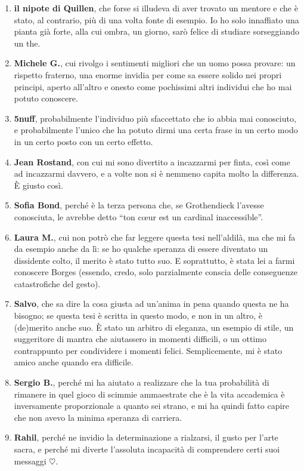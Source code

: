 \begin{enumerate}
\item {\bf il nipote di Quillen}, che forse si illudeva di aver trovato un mentore e che è stato, al contrario, più di una volta fonte di esempio. Io ho solo innaffiato una pianta già forte, alla cui ombra, un giorno, sarò felice di studiare sorseggiando un the.
\item {\bf Michele G.}, cui rivolgo i sentimenti migliori che un uomo possa provare: un rispetto fraterno, una enorme invidia per come sa essere solido nei propri principi, aperto all'altro e onesto come pochissimi altri individui che ho mai potuto conoscere.
\item {\bf 5nuff}, probabilmente l'individuo più sfaccettato che io abbia mai conosciuto, e probabilmente l'unico che ha potuto dirmi una certa frase in un certo modo in un certo posto con un certo effetto.
\item {\bf Jean Rostand}, con cui mi sono divertito a incazzarmi per finta, così come ad incazzarmi davvero, e a volte non si è nemmeno capita molto la differenza. È giusto così.
\item {\bf Sofia Bond}, perché è la terza persona che, se Grothendieck l'avesse conosciuta, le avrebbe detto ``ton c{\oe}ur est un cardinal inaccessible''.
\item {\bf Laura M.}, cui non potrò che far leggere questa tesi nell'aldilà, ma che mi fa da esempio anche da lì: se ho qualche speranza di essere diventato un dissidente colto, il merito è stato tutto suo. E soprattutto, è stata lei a farmi conoscere Borges (essendo, credo, solo parzialmente conscia delle conseguenze catastrofiche del gesto).
\item {\bf Salvo}, che sa dire la cosa giusta ad un'anima in pena quando questa ne ha bisogno; se questa tesi è scritta in questo modo, e non in un altro, è (de)merito anche suo. È stato un arbitro di eleganza, un esempio di stile, un suggeritore di mantra che aiutassero in momenti difficili, o un ottimo contrappunto per condividere i momenti felici. Semplicemente, mi è stato amico anche quando era difficile.
\item {\bf Sergio B.}, perché mi ha aiutato a realizzare che la tua probabilità di rimanere in quel gioco di scimmie ammaestrate che è la vita accademica è inversamente proporzionale a quanto sei strano, e mi ha quindi fatto capire che non avevo la minima speranza di carriera.
\item {\bf Rahil}, perché ne invidio la determinazione a rialzarsi, il gusto per l'arte sacra, e perché mi diverte l'assoluta incapacità di comprendere certi suoi messaggi $\heartsuit$.

\end{enumerate}

